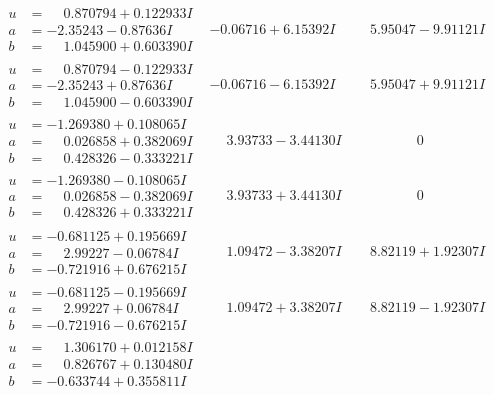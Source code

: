 \documentclass[1p]{elsarticle_modified}
\theoremstyle{definition}
\begin{document}
$$\begin{array}{c|c|c}
\begin{aligned}
u &= \phantom{-}0.870794 + 0.122933 I \\
a &= -2.35243 - 0.87636 I \\
b &= \phantom{-}1.045900 + 0.603390 I\end{aligned}
 & -0.06716 + 6.15392 I & \phantom{-}5.95047 - 9.91121 I \\ \hline\begin{aligned}
u &= \phantom{-}0.870794 - 0.122933 I \\
a &= -2.35243 + 0.87636 I \\
b &= \phantom{-}1.045900 - 0.603390 I\end{aligned}
 & -0.06716 - 6.15392 I & \phantom{-}5.95047 + 9.91121 I \\ \hline\begin{aligned}
u &= -1.269380 + 0.108065 I \\
a &= \phantom{-}0.026858 + 0.382069 I \\
b &= \phantom{-}0.428326 - 0.333221 I\end{aligned}
 & \phantom{-}3.93733 - 3.44130 I & \phantom{-0.000000 } 0 \\ \hline\begin{aligned}
u &= -1.269380 - 0.108065 I \\
a &= \phantom{-}0.026858 - 0.382069 I \\
b &= \phantom{-}0.428326 + 0.333221 I\end{aligned}
 & \phantom{-}3.93733 + 3.44130 I & \phantom{-0.000000 } 0 \\ \hline\begin{aligned}
u &= -0.681125 + 0.195669 I \\
a &= \phantom{-}2.99227 - 0.06784 I \\
b &= -0.721916 + 0.676215 I\end{aligned}
 & \phantom{-}1.09472 - 3.38207 I & \phantom{-}8.82119 + 1.92307 I \\ \hline\begin{aligned}
u &= -0.681125 - 0.195669 I \\
a &= \phantom{-}2.99227 + 0.06784 I \\
b &= -0.721916 - 0.676215 I\end{aligned}
 & \phantom{-}1.09472 + 3.38207 I & \phantom{-}8.82119 - 1.92307 I \\ \hline\begin{aligned}
u &= \phantom{-}1.306170 + 0.012158 I \\
a &= \phantom{-}0.826767 + 0.130480 I \\
b &= -0.633744 + 0.355811 I\end{aligned}

\end{array}$$
\end{document}
